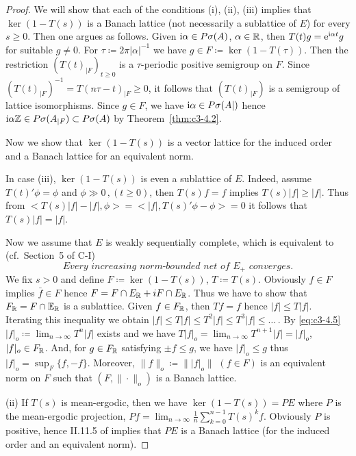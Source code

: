 \begin{proof}
	We will show that each of the conditions (i), (ii), (iii) implies that $\ker(1 - T(s))$ is a Banach lattice (not necessarily a sublattice of $E$) for every $s \geq 0$. 
	Then one argues as follows. Given $\mathrm{i}\alpha \in P\sigma(A)$, $\alpha \in \mathbb{R} $, then $T(t)g = \mathrm{e}^{\mathrm{i}\alpha t}g$ for suitable $g \neq 0$. 
	For $\tau \coloneqq  2\pi|\alpha|^{-1}$ we have $g \in F \coloneqq  \ker (1 - T(\tau))$. 
	Then the restriction $(T(t)_{|F})_{t \geq 0}$ is a $\tau$-periodic positive semigroup on $F$. 
	Since $\left(T(t)_{|F}\right)^{-1} = T(n\tau-t)_{|F} \geq 0$, it follows that $(T(t)_{|F})$ is a semigroup of lattice isomorphisms. 
	Since $g \in F$, we have $\mathrm{i}\alpha \in P\sigma(A|)$ hence $\mathrm{i}\alpha\mathbb{Z} \in P\sigma(A_{|F}) \subset P\sigma(A)$ by Theorem~\ref{thm:c3-4.2}.
	
	Now we show that $\ker (1 - T(s))$ is a vector lattice for the induced order and a Banach lattice for an equivalent norm.
	
	In case (iii), $\ker (1 - T(s))$ is even a sublattice of $E$. 
	Indeed, assume $T(t)'\phi = \phi$ and $\phi \gg 0\,, (t \geq 0)$, then $T(s)f = f$ implies $T(s)|f| \geq |f|$. 
	Thus from $<T(s)|f| - |f|,\phi> = <|f|,T(s)'\phi - \phi> = 0$ it follows that $T(s)|f| = |f|$.
	
	Now we assume that $E$ is weakly sequentially complete, which is equivalent to (cf.\ Section~5 of C-I)
	\begin{equation}\label{eq:c3-4.5}
	\textit{Every increasing norm-bounded net of $E_{+}$ converges}.
	\end{equation}
	We fix $s > 0$ and define $F \coloneqq  \ker (1 - T(s))$, $T \coloneqq  T(s)$. 
	Obviously $f \in F$ implies $\bar{f} \in F$ hence $F = F\cap E_{\mathbb{R} } + iF\cap E_{\mathbb{R} }$. 
	Thus we have to show that $F_{\mathbb{R} } = F\cap\mathbb{E}_{\mathbb{R} }$ is a sublattice. 
	Given $f \in F_{\mathbb{R} }$, then $Tf = f$ hence $|f| \leq T|f|$. 
	Iterating this inequality we obtain $|f| \leq T|f| \leq T^{2}|f| \leq T^{3}|f| \leq \dots\,.$ 
	By \eqref{eq:c3-4.5} $|f|_{o} \coloneqq  \lim_{n\to \infty} T^{n}|f|$ exists and we have $T|f|_{o} = \lim_{n\to \infty} T^{n+1}|f| = |f|_{o}$, \ie $|f|_{o} \in F_{\mathbb{R} }$.
	And, for $g \in F_{\mathbb{R} }$ satisfying $\pm f \leq g$, we have $|f|_{o} \leq g$ thus $|f|_{o} = \sup_{F}\{f,-f\}$. 
	Moreover, $\|f\|_{o} \coloneqq  \||f|_{o}\|$ $(f \in F)$ is an equivalent norm on $F$ such that $(F,\|\cdot\|_{o})$ is a Banach lattice.
	
	(ii) If $T(s)$ is mean-ergodic, then we have $\ker (1 - T(s)) = PE$ where $P$ is the mean-ergodic projection, \ie $Pf = \lim_{n\to \infty}\frac{1}{n}\sum_{k=0}^{n-1}T(s)^{k}f$.
	Obviously $P$ is positive, hence II.11.5 of \citet{schaefer:1974} implies that $PE$ is a Banach lattice (for the induced order and an equivalent norm).
\end{proof}

